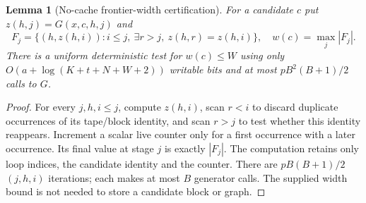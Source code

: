 \documentclass[11pt]{article}
\newtheorem{lemma}{Lemma}
\begin{document}
\begin{lemma}[No-cache frontier-width certification]
For a candidate $c$ put $z(h,j)=G(x,c,h,j)$ and
\[
F_j=\{(h,z(h,i)):i\le j,\ \exists r>j,\ z(h,r)=z(h,i)\},
\quad w(c)=\max_j|F_j|.
\]
There is a uniform deterministic test for $w(c)\le W$
using only $O(a+\log(K+t+N+W+2))$ writable bits
and at most $pB^2(B+1)/2$ calls to $G$.
\end{lemma}
\begin{proof}
For every $j,h,i\le j$, compute $z(h,i)$, scan $r<i$
to discard duplicate occurrences of its tape/block identity,
and scan $r>j$ to test whether this identity reappears.
Increment a scalar live counter only for a first occurrence with
a later occurrence. Its final value at stage $j$ is exactly
$|F_j|$. The computation retains only loop indices, the
candidate identity and the counter. There are
$pB(B+1)/2$ $(j,h,i)$ iterations; each makes at most $B$
generator calls. The supplied width bound is not needed to
store a candidate block or graph.
\end{proof}
\end{document}
